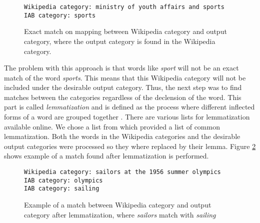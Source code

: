 \begin{figure}[h]
\centering
\begin{lstlisting}
Wikipedia category: ministry of youth affairs and sports
IAB category: sports
\end{lstlisting}
\caption[Exact match on mapping between Wikipedia category and output category]{Exact match on mapping between Wikipedia category and output category, where the output category is found in the Wikipedia category.}
\label{fig:catmapping_exactmatch}
\end{figure}
The problem with this approach is that words like \emph{sport} will not be an exact match of the word \emph{sports}. This means that this Wikipedia category will not be included under the desirable output category. Thus, the next step was to find matches between the categories regardless of the declension of the word. This part is called \emph{lemmatization} and is defined as the process where different inflected forms of a word are grouped together \cite{wiki:lemmatisation}\cite[p.~30-33]{iirbook}. There are various lists for lemmatization available online. We chose a list from \cite{lemmatizationlist} which provided a list of common lemmatization. Both the words in the Wikipedia categories and the desirable output categories were processed so they where replaced by their lemma. 
Figure \ref{fig:catmapping_lemmamatch} shows example of a match found after lemmatization is performed. 

\begin{figure}[h]
\centering
\begin{lstlisting}
Wikipedia category: sailors at the 1956 summer olympics
IAB category: olympics
IAB category: sailing
\end{lstlisting}
\caption[Example of match after lemmatization]{Example of a match between Wikipedia category and output category after lemmatization, where \emph{sailors} match with \emph{sailing}}
\label{fig:catmapping_lemmamatch}
\end{figure}

\begin{comment}
\subsubsection{Categories not relevant for classification}
Not all categories are suitable for classification, some categories are still just relevant for maintaining a well-structured encyclopedia. Example of such categories are \emph{container categories}, which are categories only containing subcategories. All container categories where found by looking at the file asdfasdf  . Some of these categories have already been removed because they are also hidden categories, but a total of 69 023 categories could be disregarded for this purpose. 
\end{comment}

